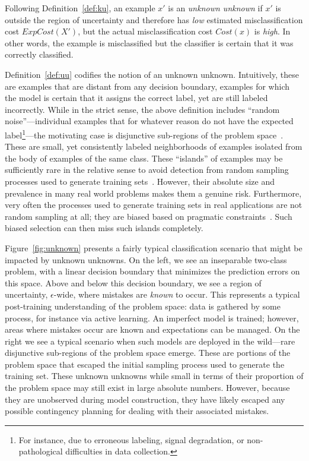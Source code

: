 \begin{definition}
\label{def:uu}
Following Definition~\ref{def:ku}, an example $x'$ is an \emph{unknown unknown} if $x'$ is outside the region of uncertainty and therefore has \emph{low} estimated misclassification cost $\mathit{ExpCost}(X')$, but the actual misclassification cost $\mathit{Cost}(x)$ is \emph{high}. In other words, the example is misclassified but the classifier is certain that it was correctly classified.\smartqed
\end{definition}

Definition~\ref{def:uu} codifies the notion of an unknown unknown. Intuitively, these are examples that are distant from any decision boundary, examples for which the model is certain that it assigns the correct label, yet are still labeled incorrectly.  While in the strict sense, the above definition includes ``random noise''---individual examples that for whatever reason do not have the expected label\footnote{For instance,  due to erroneous labeling, signal degradation, or non-pathological difficulties in data collection.}---the motivating case is disjunctive sub-regions of the problem space~\cite{weiss10disjunct}. These are small, yet consistently labeled neighborhoods of examples isolated from the body of examples of the same class. These ``islands'' of examples may be sufficiently rare in the relative sense to avoid detection from random sampling processes used to generate training sets~\cite{attenberg:2010inactive}. However, their absolute size and prevalence in many real world problems makes them a genuine risk.  Furthermore, very often the processes used to generate training sets in real applications are not random sampling at all; they are biased based on pragmatic constraints~\cite{Perlich2013WP}.  Such biased selection can then miss such islands completely.

Figure~\ref{fig:unknown} presents a fairly typical classification
scenario that might be impacted by unknown unknowns. On the left,
we see an inseparable two-class problem, with a linear decision
boundary that minimizes the prediction errors on this space. Above and
below this decision boundary, we see a region of uncertainty, $\epsilon$-wide,
where mistakes are \emph{known} to occur. This
represents a typical post-training understanding of the problem space: 
data is gathered by some process, for instance via active
learning. An imperfect model is trained; however, areas where mistakes
occur are known and expectations can be managed. On the right we see
a typical scenario when such models are deployed in the wild---rare
disjunctive sub-regions of the problem space emerge.  These are portions of the
problem space that escaped the initial sampling process used to generate
the training set. These unknown unknowns while small in terms of their
proportion of the problem space may still exist in large absolute
numbers.  However, because they are unobserved during model
construction, they have likely escaped any possible contingency
planning for dealing with their associated mistakes.

